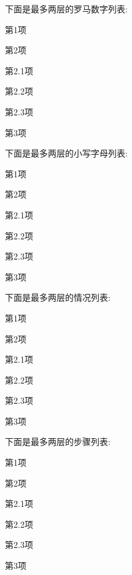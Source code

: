 下面是最多两层的罗马数字列表:
\begin{romanenum}
    \item 第1项
    \item 第2项
    \begin{romanenum}
        \item 第2.1项
        \item 第2.2项
        \item 第2.3项
    \end{romanenum}
    \item 第3项
\end{romanenum}

下面是最多两层的小写字母列表:
\begin{alphaenum}
    \item 第1项
    \item 第2项
    \begin{alphaenum}
        \item 第2.1项
        \item 第2.2项
        \item 第2.3项
    \end{alphaenum}
    \item 第3项
\end{alphaenum}

下面是最多两层的情况列表:
\begin{caseenum}
    \item 第1项
    \item 第2项
    \begin{caseenum}
        \item 第2.1项
        \item 第2.2项
        \item 第2.3项
    \end{caseenum}
    \item 第3项
\end{caseenum}

下面是最多两层的步骤列表:
\begin{stepenum}
    \item 第1项
    \item 第2项
    \begin{stepenum}
        \item 第2.1项
        \item 第2.2项
        \item 第2.3项
    \end{stepenum}
    \item 第3项
\end{stepenum}

